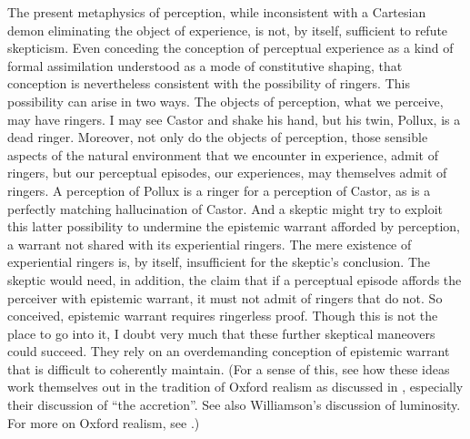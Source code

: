 The present metaphysics of perception, while inconsistent with a Cartesian demon eliminating the object of experience, is not, by itself, sufficient to refute skepticism. Even conceding the conception of perceptual experience as a kind of formal assimilation understood as a mode of constitutive shaping, that conception is nevertheless consistent with the possibility of ringers. This possibility can arise in two ways. The objects of perception, what we perceive, may have ringers. I may see Castor and shake his hand, but his twin, Pollux, is a dead ringer. Moreover, not only do the objects of perception, those sensible aspects of the natural environment that we encounter in experience, admit of ringers, but our perceptual episodes, our experiences, may themselves admit of ringers. A perception of Pollux is a ringer for a perception of Castor, as is a perfectly matching hallucination of Castor. And a skeptic might try to exploit this latter possibility to undermine the epistemic warrant afforded by perception, a warrant not shared with its experiential ringers. The mere existence of experiential ringers is, by itself, insufficient for the skeptic's conclusion. The skeptic would need, in addition, the claim that if a perceptual episode affords the perceiver with epistemic warrant, it must not admit of ringers that do not. So conceived, epistemic warrant requires ringerless proof. Though this is not the place to go into it, I doubt very much that these further skeptical maneovers could succeed. They rely on an overdemanding conception of epistemic warrant that is difficult to coherently maintain. (For a sense of this, see how these ideas work themselves out in the tradition of Oxford realism as discussed in \citealt{Kalderon:2010fk}, especially their discussion of ``the accretion''. See also Williamson's \citeyearpar{Williamson:2000lr} discussion of luminosity. For more on Oxford realism, see \citealt{Marion:2000al,Marion:2000bi}.)

